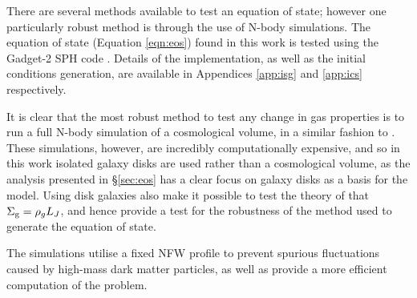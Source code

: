 There are several methods available to test an equation of state; however one particularly robust method is through the use of N-body simulations.
The equation of state (Equation \ref{eqn:eos}) found in this work is tested using the Gadget-2 SPH code \citep{springel_cosmological_2005}.
Details of the implementation, as well as the initial conditions generation, are available in Appendices \ref{app:isg} and \ref{app:ics} respectively.

It is clear that the most robust method to test any change in gas properties is to run a full N-body simulation of a cosmological volume, in a similar fashion to \citet{schaye_eagle_2015, vogelsberger_introducing_2014}.
These simulations, however, are incredibly computationally expensive, and so in this work isolated galaxy disks are used rather than a cosmological volume, as the analysis presented in \S \ref{sec:eos} has a clear focus on galaxy disks as a basis for the model.
Using disk galaxies also make it possible to test the theory of \citet{schaye_model-independent_2001} that $\Sigma_\mathrm{g} = \rho_g L_J$, and hence provide a test for the robustness of the method used to generate the equation of state.

The simulations utilise a fixed NFW profile \citep{coe_dark_2010, navarro_structure_1996} to prevent spurious fluctuations caused by high-mass dark matter particles, as well as provide a more efficient computation of the problem.

